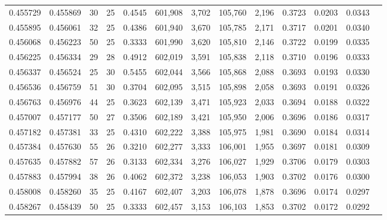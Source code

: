 \begin{tabular}{rrrrrrrrrrrrr}
0.455729 & 0.455869 &    30 &  25 &                                     0.4545 & 601,908 &   3,702 & 105,760 &   2,196 & 0.3723 & 0.0203 & 0.0343 \\
0.455895 & 0.456061 &    32 &  25 &                                     0.4386 & 601,940 &   3,670 & 105,785 &   2,171 & 0.3717 & 0.0201 & 0.0340 \\
0.456068 & 0.456223 &    50 &  25 &                                     0.3333 & 601,990 &   3,620 & 105,810 &   2,146 & 0.3722 & 0.0199 & 0.0335 \\
0.456225 & 0.456334 &    29 &  28 &                                     0.4912 & 602,019 &   3,591 & 105,838 &   2,118 & 0.3710 & 0.0196 & 0.0333 \\
0.456337 & 0.456524 &    25 &  30 &                                     0.5455 & 602,044 &   3,566 & 105,868 &   2,088 & 0.3693 & 0.0193 & 0.0330 \\
0.456536 & 0.456759 &    51 &  30 &                                     0.3704 & 602,095 &   3,515 & 105,898 &   2,058 & 0.3693 & 0.0191 & 0.0326 \\
0.456763 & 0.456976 &    44 &  25 &                                     0.3623 & 602,139 &   3,471 & 105,923 &   2,033 & 0.3694 & 0.0188 & 0.0322 \\
0.457007 & 0.457177 &    50 &  27 &                                     0.3506 & 602,189 &   3,421 & 105,950 &   2,006 & 0.3696 & 0.0186 & 0.0317 \\
0.457182 & 0.457381 &    33 &  25 &                                     0.4310 & 602,222 &   3,388 & 105,975 &   1,981 & 0.3690 & 0.0184 & 0.0314 \\
0.457384 & 0.457630 &    55 &  26 &                                     0.3210 & 602,277 &   3,333 & 106,001 &   1,955 & 0.3697 & 0.0181 & 0.0309 \\
0.457635 & 0.457882 &    57 &  26 &                                     0.3133 & 602,334 &   3,276 & 106,027 &   1,929 & 0.3706 & 0.0179 & 0.0303 \\
0.457883 & 0.457994 &    38 &  26 &                                     0.4062 & 602,372 &   3,238 & 106,053 &   1,903 & 0.3702 & 0.0176 & 0.0300 \\
0.458008 & 0.458260 &    35 &  25 &                                     0.4167 & 602,407 &   3,203 & 106,078 &   1,878 & 0.3696 & 0.0174 & 0.0297 \\
0.458267 & 0.458439 &    50 &  25 &                                     0.3333 & 602,457 &   3,153 & 106,103 &   1,853 & 0.3702 & 0.0172 & 0.0292 \\

\end{tabular}
